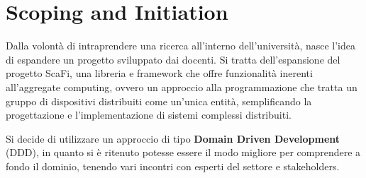 \section{Scoping and Initiation}


Dalla volontà di intraprendere una ricerca all'interno dell'università, nasce l'idea di espandere un progetto sviluppato dai docenti.
Si tratta dell'espansione del progetto ScaFi, una libreria e framework che offre funzionalità inerenti all'aggregate computing, ovvero un
approccio alla programmazione che tratta un gruppo di dispositivi distribuiti come un'unica entità, semplificando la progettazione e l'implementazione
di sistemi complessi distribuiti.

Si decide di utilizzare un approccio di tipo \textbf{Domain Driven Development} (DDD), in quanto si è ritenuto potesse essere il modo migliore
per comprendere a fondo il dominio, tenendo vari incontri con esperti del settore e stakeholders.

